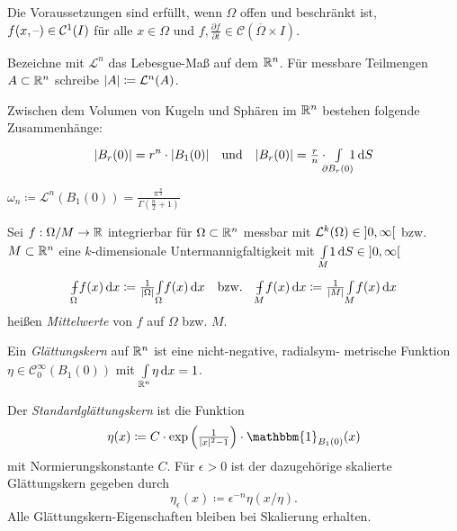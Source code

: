 \documentclass{cheat-sheet}
\def\Xint#1{\mathchoice
   {\XXint\displaystyle\textstyle{#1}}%
   {\XXint\textstyle\scriptstyle{#1}}%
   {\XXint\scriptstyle\scriptscriptstyle{#1}}%
   {\XXint\scriptscriptstyle\scriptscriptstyle{#1}}%
   \!\int}
\def\XXint#1#2#3{{\setbox0=\hbox{$#1{#2#3}{\int}$}
     \vcenter{\hbox{$#2#3$}}\kern-.5\wd0}}
\def\dashint{\Xint-}
\newcommand{\mymvint}[2]{{\textstyle \dashint\limits_{#1}^{#2}}}
\newcommand{\MVInt}[4]{\mymvint{#1}{#2} #3 \,\d #4}
\newcommand{\ind}{\mathbbm{1}} %
\begin{document}
\begin{bem}
  Die Voraussetzungen sind erfüllt, wenn $\Omega$ offen und beschränkt ist, $f(x, \text{--}) \in \mathcal{C}^1(I)$ für alle $x \in \Omega$ und $f, \tfrac{\partial f}{\partial t} \in \mathcal{C}(\overline{\Omega} \times I)$.
\end{bem}

\begin{nota}
  Bezeichne mit $\mathcal{L}^n$ das Lebesgue-Maß auf dem $\mathbb{R}^n$. Für messbare Teilmengen $A \subset \mathbb{R}^n$ schreibe $\lvert A\rvert \coloneqq \mathcal{L}^n(A)$.
\end{nota}

\begin{bsp}
  Zwischen dem Volumen von Kugeln und Sphären im $\mathbb{R}^n$ bestehen folgende Zusammenhänge:
  \[
    \abs{B_r(0)} = r^n \cdot \abs{B_1(0)}
    \quad \text{und} \quad
    \abs{B_r(0)} = \tfrac{r}{n} \cdot \enspace\Int{\mathclap{\partial B_r(0)}}{}{\enspace1}{S}
  \]
\end{bsp}
\vspace{-12pt}
\begin{nota}
  $\omega_n \coloneqq \mathcal{L}^n(B_1(0)) = \frac{\pi^{\tfrac{n}{2}}}{\Gamma(\tfrac{n}{2} + 1)}$
\end{nota}

\begin{nota}
  Sei $f : \Omega / M \to \mathbb{R}$ integrierbar für $\Omega \subset \mathbb{R}^n$ messbar mit $\mathcal{L}^k(\Omega) \in \left] 0, \infty \right[$ bzw. $M \subset \mathbb{R}^n$ eine $k$-dimensionale Untermannigfaltigkeit mit ${\textstyle \int\limits_{M}^{}} 1 \,\mathrm{d} S \in \left] 0, \infty \right[$
  \[
    \MVInt{\Omega}{}{f(x)}{x} \coloneqq \tfrac{1}{\abs{\Omega}} \Int{\Omega}{}{f(x)}{x}
    \quad \text{bzw.} \quad
    \MVInt{M}{}{f(x)}{x} \coloneqq \tfrac{1}{\abs{M}} \Int{M}{}{f(x)}{x}
  \]
  heißen \emph{Mittelwerte} von $f$ auf $\Omega$ bzw. $M$.
\end{nota}

\begin{defn}
  Ein \emph{Glättungskern} auf $\mathbb{R}^n$ ist eine nicht-negative, radialsym- metrische Funktion $\eta \in \mathcal{C}_0^\infty(B_1(0))$ mit ${\textstyle \int\limits_{\mathbb{R}^n}^{}} \eta \,\mathrm{d} x = 1$.
\end{defn}

\begin{defn}
  Der \emph{Standardglättungskern} ist die Funktion
  \[ \eta(x) \coloneqq C \cdot \exp \left(\tfrac{1}{\abs{x}^2 - 1}\right) \cdot \ind_{B_1(0)}(x) \]
  mit Normierungskonstante $C$. Für $\epsilon > 0$ ist der dazugehörige skalierte Glättungskern gegeben durch
  \[ \eta_{\epsilon}(x) \coloneqq \epsilon^{-n} \eta(x/\eta). \]
  Alle Glättungskern-Eigenschaften bleiben bei Skalierung erhalten.
\end{defn}
\end{document}
